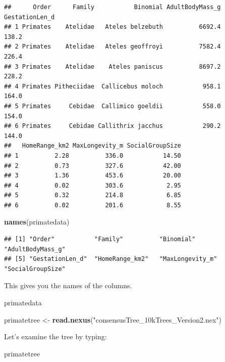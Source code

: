 \documentclass[]{article}
\newenvironment{Shaded}{\begin{snugshade}}{\end{snugshade}}
\newcommand{\KeywordTok}[1]{\textcolor[rgb]{0.13,0.29,0.53}{\textbf{{#1}}}}
\newcommand{\StringTok}[1]{\textcolor[rgb]{0.31,0.60,0.02}{{#1}}}
\newcommand{\NormalTok}[1]{{#1}}
\begin{document}
\begin{verbatim}
##      Order      Family           Binomial AdultBodyMass_g GestationLen_d
## 1 Primates    Atelidae   Ateles belzebuth          6692.4          138.2
## 2 Primates    Atelidae   Ateles geoffroyi          7582.4          226.4
## 3 Primates    Atelidae    Ateles paniscus          8697.2          228.2
## 4 Primates Pitheciidae  Callicebus moloch           958.1          164.0
## 5 Primates     Cebidae  Callimico goeldii           558.0          154.0
## 6 Primates     Cebidae Callithrix jacchus           290.2          144.0
##   HomeRange_km2 MaxLongevity_m SocialGroupSize
## 1          2.28          336.0           14.50
## 2          0.73          327.6           42.00
## 3          1.36          453.6           20.00
## 4          0.02          303.6            2.95
## 5          0.32          214.8            6.85
## 6          0.02          201.6            8.55
\end{verbatim}

\begin{Shaded}
\begin{Highlighting}[]
\KeywordTok{names}\NormalTok{(primatedata)}
\end{Highlighting}
\end{Shaded}

\begin{verbatim}
## [1] "Order"           "Family"          "Binomial"        "AdultBodyMass_g"
## [5] "GestationLen_d"  "HomeRange_km2"   "MaxLongevity_m"  "SocialGroupSize"
\end{verbatim}

This gives you the names of the columns.

\begin{Shaded}
\begin{Highlighting}[]
\NormalTok{primatedata}
\end{Highlighting}
\end{Shaded}

\begin{Shaded}
\begin{Highlighting}[]
\NormalTok{primatetree <-}\StringTok{ }\KeywordTok{read.nexus}\NormalTok{(}\StringTok{"consensusTree_10kTrees_Version2.nex"}\NormalTok{)}
\end{Highlighting}
\end{Shaded}

Let's examine the tree by typing:

\begin{Shaded}
\begin{Highlighting}[]
\NormalTok{primatetree}
\end{Highlighting}
\end{Shaded}
\end{document}
